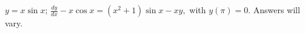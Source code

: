 {
$y = x\sin x$; $\displaystyle\frac{dy}{dx} - x\cos x= (x^2+1)\sin x - xy,$ with $y(\pi) = 0$.
}
{
Answers will vary.
}
